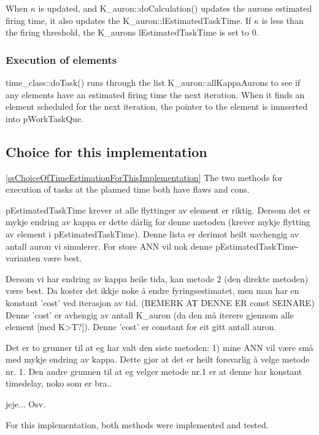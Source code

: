	When $\kappa$ is updated, and K\_auron::doCalculation() updates the aurons estimated firing time, it also updates the K\_auron::lEstimatedTaskTime.
	If $\kappa$ is less than the firing threshold, the K\_aurons lEstimatedTaskTime is set to 0. 

	\subsubsection{Execution of elements}
	time\_class::doTask() runs through the list K\_auron::allKappaAurons to see if any elements have an estimated firing time the next iteration.
	When it finds an element scheduled for the next iteration, the pointer to the element is imnserted into pWorkTaskQue.


	\subsection{Choice for this implementation}
	\ref{ssChoiceOfTimeEstimationForThisImplementation}
	The two methods for execution of tasks at the planned time both have flaws and cons.
	
	pEstimatedTaskTime krever at alle flyttinger av element er riktig. Dersom det er mykje endring av kappa er dette dårlig for denne metoden (krever mykje flytting av element i pEstimatedTaskTime).
	Denne lista er derimot heilt uavhengig av antall auron vi simulerer. For store ANN vil nok denne pEstimatedTaskTime-varianten være best.

	Dersom vi har endring av kappa heile tida, kan metode 2 (den direkte metoden) være best.
	Da koster det ikkje noke å endre fyringsestimatet, men man har en konstant 'cost' ved iterasjon av tid. (BEMERK AT DENNE ER const SEINARE)
	Denne 'cost' er avhengig av antall K\_auron (da den må iterere gjennom alle element [med K>T?]). Denne 'cost' er constant for eit gitt antall auron.

	Det er to grunner til at eg har valt den siste metoden: 1) mine ANN vil være små med mykje endring av kappa. Dette gjør at det er heilt forsvarlig å velge metode nr. 1.
	Den andre grunnen til at eg velger metode nr.1 er at denne har konstant timedelay, noko som er bra..

	jeje... Osv.

	For this implementation, both methods were implemented and tested. 






